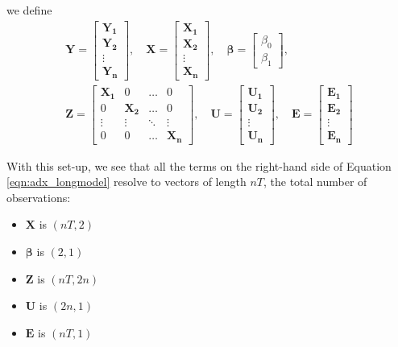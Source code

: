 \documentclass{article}
\begin{document}
we define
\begin{gather*}
\mathbf{Y} = 
\begin{bmatrix}
    \mathbf{Y_1} \\ \mathbf{Y_2} \\ \vdots \\ \mathbf{Y_n}
\end{bmatrix},
\quad
\mathbf{X}=
\begin{bmatrix}
    \mathbf{X_{1}} \\ \mathbf{X_{2}} \\ \vdots \\ \mathbf{X_{n}}
\end{bmatrix},
\quad
\boldsymbol{\beta} = 
\begin{bmatrix}
    \beta_{0} \\ \beta_{1} 
\end{bmatrix}, \\
\mathbf{Z} = 
\begin{bmatrix}
    \mathbf{X_{1}} & 0 & \hdots & 0 \\
    0 & \mathbf{X_{2}} & \hdots & 0 \\
  	\vdots & \vdots & \ddots & \vdots \\ 
    0 & 0 & \hdots & \mathbf{X_{n}}
\end{bmatrix},
\quad
\mathbf{U} = 
\begin{bmatrix}
    \mathbf{U_1} \\ \mathbf{U_2} \\ \vdots \\ \mathbf{U_n}
\end{bmatrix},
\quad
\mathbf{E} = 
\begin{bmatrix}
    \mathbf{E_1} \\ \mathbf{E_2} \\ \vdots \\ \mathbf{E_n}
\end{bmatrix}
\end{gather*}

With this set-up, we see that all the terms on the right-hand side of Equation \ref{eqn:adx_longmodel} resolve to vectors of length $nT$, the total number of observations:
\begin{itemize}
	\item $\mathbf{X}$ is $(nT,2)$
    \item $\boldsymbol{\beta}$ is $(2,1)$
    \item $\mathbf{Z}$ is $(nT,2n)$
    \item $\mathbf{U}$ is $(2n,1)$
    \item $\mathbf{E}$ is $(nT,1)$
\end{itemize}
\end{document}

